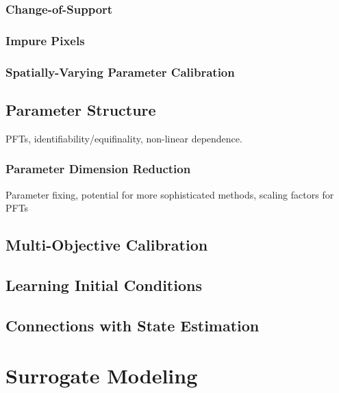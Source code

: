 \documentclass[12pt]{article}
\begin{document}
\subsubsection{Change-of-Support}
\subsubsection{Impure Pixels}
\subsubsection{Spatially-Varying Parameter Calibration}


\subsection{Parameter Structure} \label{param-structure}
PFTs, identifiability/equifinality, non-linear dependence.

\subsubsection{Parameter Dimension Reduction}
Parameter fixing, potential for more sophisticated methods, scaling factors for PFTs

\subsection{Multi-Objective Calibration} \label{multi-objective}

\subsection{Learning Initial Conditions}

\subsection{Connections with State Estimation}

\section{Surrogate Modeling}
\end{document}
